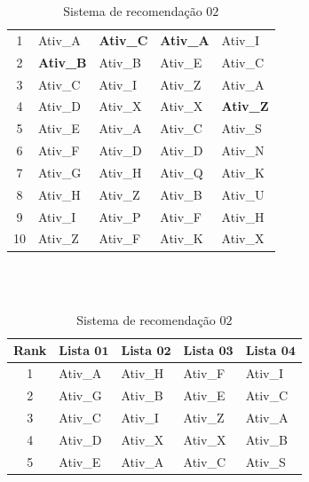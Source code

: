 \begin{table}[!htb]
\begin{subtable}{.5\linewidth}
\begin{tabular}{|c|l|l|l|l|}
			1                & Ativ\_A	     		& \textbf{Ativ\_C}		& \textbf{Ativ\_A}	& Ativ\_I                    \\
			2                & \textbf{Ativ\_B} 	& Ativ\_B   			& Ativ\_E   		& Ativ\_C 	                 \\
			3                & Ativ\_C    			& Ativ\_I    			& Ativ\_Z			& Ativ\_A                    \\
			4                & Ativ\_D   			& Ativ\_X    			& Ativ\_X    		& \textbf{Ativ\_Z}           \\
			5                & Ativ\_E			   	& Ativ\_A			  	& Ativ\_C    		& Ativ\_S	                 \\
			6                & Ativ\_F   			& Ativ\_D    			& Ativ\_D    		& Ativ\_N                    \\
			7                & Ativ\_G   			& Ativ\_H    			& Ativ\_Q    		& Ativ\_K	                 \\
			8                & Ativ\_H   			& Ativ\_Z    			& Ativ\_B   		& Ativ\_U	                 \\
			9                & Ativ\_I    			& Ativ\_P   			& Ativ\_F   		& Ativ\_H	                 \\
			10               & Ativ\_Z   			& Ativ\_F    			& Ativ\_K    		& Ativ\_X	           \\ \hline
		\end{tabular}
		\caption{Sistema de recomendação \(02\)}
		\label{TABELAO:SISTEMA_RECOMENDACAO_02}
	\end{subtable}
	\\ \\ \hfill 
	\begin{subtable}{.5\linewidth}
		\centering
		\begin{tabular}{|c|l|l|l|l|} \hline 
			\textbf{Rank} & \textbf{Lista} \(\mathbf{01}\) & \textbf{Lista} \(\mathbf{02}\) & \textbf{Lista} \(\mathbf{03}\) & \textbf{Lista} \(\mathbf{04}\) \\ \hline 
			1                & Ativ\_A			    & Ativ\_H    			& Ativ\_F   		& Ativ\_I                    \\
			2                & Ativ\_G    			& Ativ\_B   			& Ativ\_E   		& Ativ\_C 	                 \\
			3                & Ativ\_C    			& Ativ\_I    			& Ativ\_Z			& Ativ\_A                    \\
			4                & Ativ\_D   			& Ativ\_X    			& Ativ\_X    		& Ativ\_B	                 \\
			5                & Ativ\_E   			& Ativ\_A	  			& Ativ\_C    		& Ativ\_S	                 \\

\end{tabular}
\end{subtable}
\end{table}
